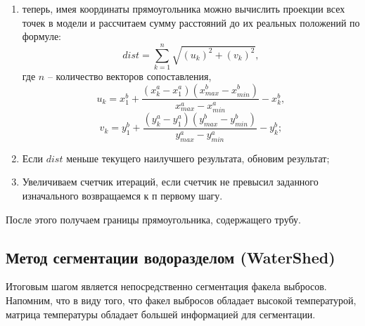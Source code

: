 \documentclass[14pt, a4paper]{extreport}
\begin{document}
\begin{enumerate}[label={\arabic*)}]
\begin{subequations}
			\begin{equation*}
				y^{b}_{1} = y^{b}_{min} - \frac{(y^{a}_{min} - y^{a}_{1})(y^{b}_{max} - y^{b}_{min})}{y^{a}_{max} - y^{a}_{min}},
			\end{equation*}
			\vspace*{-1.1cm}
			\begin{equation*}
				y^{b}_{2} = y^{b}_{max} + \frac{(y^{a}_{2} - y^{a}_{max})(y^{b}_{max} - y^{b}_{min})}{y^{a}_{max} - y^{a}_{min}};
			\end{equation*}
			\label{x,y,1,2}
			\vspace*{-0.8cm}
		\end{subequations}
		\item теперь, имея координаты прямоугольника можно вычислить проекции всех точек в модели и рассчитаем сумму расстояний до их реальных положений по формуле:
		\begin{equation}
			dist = \sum\limits_{k=1}^n \sqrt{(u_k)^2 + (v_k)^2},
			\label{dist}
		\end{equation}
		где $n$ -- количество векторов сопоставления, 
		\begin{equation*}
			u_k = x^{b}_{1} + \frac{(x^{a}_{k} - x^{a}_{1})(x^{b}_{max} - x^{b}_{min})}{x^{a}_{max} - x^{a}_{min}} - x^{b}_{k},
			\label{dist1dop}
		\end{equation*}
		\vspace*{-0.8cm}
		\begin{equation*}
			v_k = y^{b}_{1} + \frac{(y^{a}_{k} - y^{a}_{1})(y^{b}_{max} - y^{b}_{min})}{y^{a}_{max} - y^{a}_{min}} - y^{b}_{k};
			\label{dist2dop}
		\end{equation*}
		\item Если $dist$ меньше текущего наилучшего результата, обновим результат;
		\item Увеличиваем счетчик итераций, если счетчик не превысил заданного изначального возвращаемся к п первому шагу.
	\end{enumerate}
	
	После этого получаем границы прямоугольника, содержащего трубу.
	
	\subsection{Метод сегментации водоразделом (WaterShed)}
	
	Итоговым шагом является непосредственно сегментация факела выбросов. Напомним, что в виду того, что факел выбросов обладает высокой температурой, матрица температуры обладает большей информацией для сегментации.
	
\end{document}
